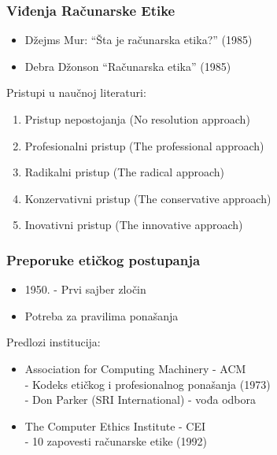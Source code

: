 \documentclass[pdf]{beamer}
\begin{document}
\begin{frame}
\frametitle{Viđenja Računarske Etike}

	\begin{itemize}

	\item Džejms Mur: ``Šta je računarska etika?'' (1985)

	\item Debra Džonson ``Računarska etika'' (1985)
	
	\end{itemize}

	Pristupi u naučnoj literaturi:
	\begin{enumerate}
	\item Pristup nepostojanja (No resolution approach)
	\item Profesionalni pristup (The professional approach)
	\item Radikalni pristup (The radical approach)
	\item Konzervativni pristup (The conservative approach)
	\item Inovativni pristup (The innovative approach)
	\end{enumerate}
	\end{frame}


\begin{frame}
\frametitle{Preporuke etičkog postupanja}

	\begin{itemize}

	\item 1950. - Prvi sajber zločin
	
	\item Potreba za pravilima ponašanja

	\end{itemize}

	Predlozi institucija:
	\begin{itemize}
		\item Association for Computing Machinery - ACM
		\\- Kodeks etičkog i profesionalnog ponašanja (1973)
		\\ - Don Parker (SRI International) - vođa odbora
		\item The Computer Ethics Institute - CEI
		\\- 10 zapovesti računarske etike (1992)
	\end{itemize}


\end{frame}
\end{document}
